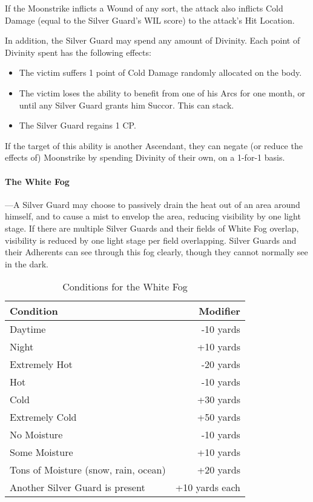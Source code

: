 \documentclass[oneside,11pt,english]{book}
\begin{document}
If the Moonstrike inflicts a Wound of any sort, the attack also inflicts Cold Damage (equal to the 
Silver Guard's WIL score) to the attack’s Hit Location. 


In addition, the Silver Guard may spend any amount of Divinity. Each point of Divinity spent has 
the following effects: 
\begin{itemize}
\item The victim suffers 1 point of Cold Damage randomly allocated on the body. 
\item The victim loses the ability to benefit from one of his Arcs for one month, or until any 
Silver Guard grants him Succor. This can stack. 
\item The Silver Guard regains 1 CP. 
\end{itemize}
If the target of this ability is another Ascendant, they can negate (or reduce the effects of) Moonstrike by spending Divinity of their own, on a 1-for-1 basis. 

\newpage
\paragraph{The White Fog}
---\quad A Silver Guard may choose to passively drain the heat out of an area around himself, and to cause 
a mist to envelop the area, reducing visibility by one light stage. If there are multiple Silver 
Guards and their fields of White Fog overlap, visibility is reduced by one light stage per field 
overlapping. Silver Guards and their Adherents can see through this fog clearly, though they 
cannot normally see in the dark. 

	\setlength{\intextsep}{0pt}
	\begin{wraptable}{r}{9 cm}
		\vspace{-10pt}\caption{Conditions for the White Fog}
		\label{tab:Dessian White Fog}
		\begin{tabu} spread 0pt {Xr}
			Condition&Modifier\\\toprule
			Daytime&-10 yards\\
			Night&+10 yards\\
			Extremely Hot&-20 yards \\
			Hot&-10 yards \\
			Cold&+30 yards \\
			Extremely Cold&+50 yards \\
			No Moisture&-10 yards \\
			Some Moisture&+10 yards \\
			Tons of Moisture (snow, rain, ocean)&+20 yards \\
			Another Silver Guard is present&+10 yards each \\
		\end{tabu}
	\end{wraptable}
	\setlength{\intextsep}{\oldintextsep}
\end{document}
